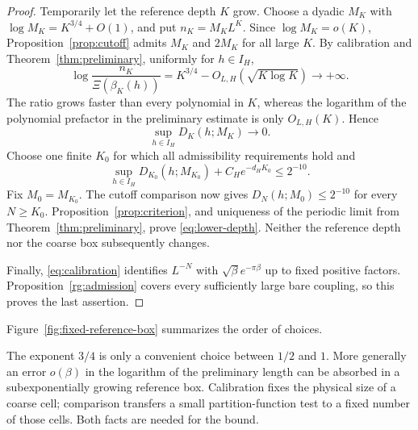 \begin{proof}
Temporarily let the reference depth $K$ grow. Choose a dyadic $M_K$ with
$\log M_K=K^{3/4}+O(1)$, and put $n_K=M_KL^K$.
Since $\log M_K=o(K)$, Proposition~\ref{prop:cutoff} admits $M_K$ and
$2M_K$ for all large $K$. By calibration and
Theorem~\ref{thm:preliminary}, uniformly for $h\in I_H$,
\[
 \log\frac{n_K}{\Xi(\beta_K(h))}
 =K^{3/4}-O_{L,H}(\sqrt{K\log K})\longrightarrow+\infty.
\]
The ratio grows faster than every polynomial in $K$, whereas the
logarithm of the polynomial prefactor in the preliminary estimate is
only $O_{L,H}(K)$. Hence
\[
 \sup_{h\in I_H}D_K(h;M_K)\longrightarrow0.
\]
Choose one finite $K_0$ for which all admissibility requirements hold
and
\[
 \sup_{h\in I_H}D_{K_0}(h;M_{K_0})+C_He^{-d_HK_0}\le2^{-10}.
\]
Fix $M_0=M_{K_0}$. The cutoff comparison now gives
$D_N(h;M_0)\le2^{-10}$ for every $N\ge K_0$.
Proposition~\ref{prop:criterion}, and uniqueness of the periodic limit
from Theorem~\ref{thm:preliminary}, prove \eqref{eq:lower-depth}.
Neither the reference depth nor the coarse box subsequently changes.

Finally, \eqref{eq:calibration} identifies $L^{-N}$ with
$\sqrt\beta e^{-\pi\beta}$ up to fixed positive factors.
Proposition~\ref{rg:admission} covers every sufficiently large bare
coupling, so this proves the last assertion.
\end{proof}

Figure~\ref{fig:fixed-reference-box} summarizes the order of choices.


The exponent $3/4$ is only a convenient choice between $1/2$ and $1$.
More generally an error $o(\beta)$ in the logarithm of the preliminary
length can be absorbed in a subexponentially growing reference box.
Calibration fixes the physical size of a coarse cell; comparison
transfers a small partition-function test to a fixed number of those
cells. Both facts are needed for the bound.

